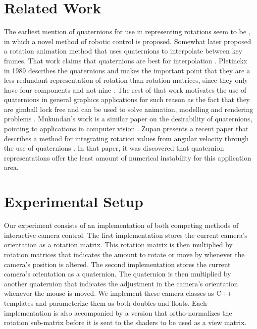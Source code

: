 \documentclass{acm_proc_article-sp}
\begin{document}
\section{Related Work}

The earliest mention of quaternions for use in representing rotations seem to be \cite{taylor79}, in which a novel method of robotic control is proposed.
Somewhat later \cite{schoemake85} proposed a rotation animation method that uses quaternions to interpolate between key frames.
That work claims that quaternions are best for interpolation \cite{schoemake85}.
Pletinckx in 1989 describes the quaternions and makes the important point that they are a less redundant representation of rotation than rotation matrices, since they only have four components and not nine \cite{pletinckx89}.
The rest of that work motivates the use of quaternions in general graphics applications for such reason as the fact that they are gimball lock free \cite{pletinckx89} and can be used to solve animation, modelling and rendering problems \cite{pletinckx89}.
Mukundan's work is a similar paper on the desirability of quaternions, pointing to applications in computer vision \cite{mukundan02}.
Zupan presents a recent paper that describes a method for integrating rotation values from angular velocity through the use of quaternions \cite{zupan11}.
In that paper, it was discovered that quaternion representations offer the least amount of numerical instability for this application area.

\section{Experimental Setup}

Our experiment consists of an implementation of both competing methods of interactive camera control.
The first implementation stores the current camera's orientation as a rotation matrix.
This rotation matrix is then multiplied by rotation matrices that indicates the amount to rotate or move by whenever the camera's position is altered.
The second implementation stores the current camera's orientation as a quaternion.
The quaternion is then multiplied by another quaternion that indicates the adjustment in the camera's orientation whenever the mouse is moved.
We implement these camera classes as C++ templates and parameterize them as both doubles and floats.
Each implementation is also accompanied by a version that ortho-normalizes the rotation sub-matrix before it is sent to the shaders to be used as a view matrix.
\end{document}

